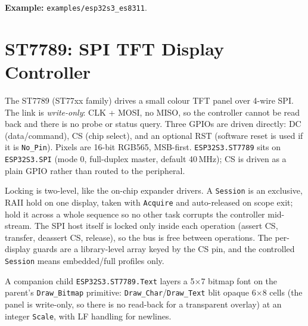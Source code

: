 \noindent\textbf{Example:} \texttt{examples/esp32s3\_es8311}.

\section{ST7789: SPI TFT Display Controller}
\label{app:ext:st7789}

The ST7789 (ST77xx family) drives a small colour TFT panel over 4-wire SPI. The
link is \emph{write-only}: CLK + MOSI, no MISO, so the controller cannot be read
back and there is no probe or status query. Three GPIOs are driven directly: DC
(data/command), CS (chip select), and an optional RST (software reset is used if it
is \texttt{No\_Pin}). Pixels are 16-bit RGB565, MSB-first. \texttt{ESP32S3.ST7789}
sits on \texttt{ESP32S3.SPI} (mode 0, full-duplex master, default 40\,MHz); CS is
driven as a plain GPIO rather than routed to the peripheral.

Locking is two-level, like the on-chip expander drivers. A \texttt{Session} is an
exclusive, RAII hold on one display, taken with \texttt{Acquire} and auto-released
on scope exit; hold it across a whole sequence so no other task corrupts the
controller mid-stream. The SPI host itself is locked only inside each operation
(assert CS, transfer, deassert CS, release), so the bus is free between operations.
The per-display guards are a library-level array keyed by the CS pin, and the
controlled \texttt{Session} means embedded/full profiles only.

A companion child \texttt{ESP32S3.ST7789.Text} layers a 5$\times$7 bitmap font on
the parent's \texttt{Draw\_Bitmap} primitive: \texttt{Draw\_Char}/\texttt{Draw\_Text}
blit opaque 6$\times$8 cells (the panel is write-only, so there is no read-back for a
transparent overlay) at an integer \texttt{Scale}, with LF handling for newlines.

